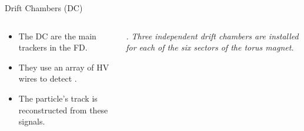 \begin{frame}{Drift Chambers (DC)}
    \label{10.33::dc}

    \begin{columns}[onlytextwidth,T]

    \begin{column}{.43\linewidth}
        \vspace{36pt}
        \begin{itemize}
            \item
                The DC are the main trackers in the FD.

            \vspace{12pt}
            \item
                They use an array of HV wires to detect .

            \vspace{12pt}
            \item
                The particle's track is reconstructed from these signals.
        \end{itemize}
    \end{column}

    \begin{column}{.55\linewidth}
        \vspace{-12pt}
        \begin{figure}[t]
        \end{figure}
        \vspace{-21pt}
        \scriptsize{\textit{
            .
            Three independent drift chambers are installed for each of the six sectors of the torus magnet.
        }}


\end{column}
\end{columns}
\end{frame}
